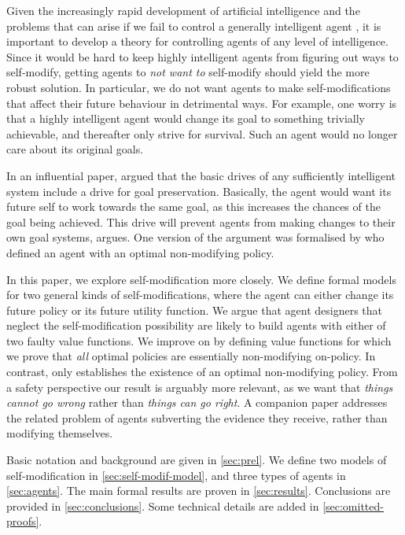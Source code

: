 \documentclass[a4paper]{article}
\theoremstyle{definition}
\theoremstyle{remark}
\begin{document}
Given the increasingly rapid development of artificial intelligence
and the problems that can arise if we fail to control a generally
intelligent agent \citep{Bostrom2014},
it is important to develop a theory for controlling agents of
any level of intelligence.
Since it would be hard to keep
highly intelligent agents from figuring out ways to self-modify,
getting agents to \emph{not want to} self-modify
should yield the more robust solution.
In particular, we do not want agents to make self-modifications
that affect their future behaviour in detrimental ways.
For example, one worry is that a highly intelligent agent would
change its goal to something
trivially achievable, and thereafter only strive for survival.
Such an agent would no longer care about its original goals.

In an influential paper, \citet{Omohundro2008} argued that
the basic drives of any sufficiently intelligent system
include a drive for goal preservation.
Basically, the agent would want its future self to work
towards the same goal, as this increases the chances of the
goal being achieved.
This drive will prevent agents from making changes
to their own goal systems, \citeauthor{Omohundro2008} argues.
One version of the argument was formalised by
\citet[Prop.~4]{Hibbard2012}
who defined an agent with an optimal non-modifying policy.

In this paper, we explore self-modification
more closely.
We define formal models for two general kinds of self-modifications,
where the agent can either change its future policy or its future utility
function.
We argue that agent designers that neglect the self-modification
possibility are likely to build agents with either
of two faulty value functions.
We improve on \citet[Prop.~4]{Hibbard2012} by defining value functions
for which we prove that \emph{all} optimal policies are essentially non-modifying
on-policy.
In contrast, \citeauthor{Hibbard2012} only establishes the existence of an
optimal non-modifying policy.
From a safety perspective our result is arguably more relevant,
as we want that \emph{things cannot go wrong} rather
than \emph{things can go right}.
A companion paper \citep{Everitt2016vrl} addresses the related problem
of agents subverting the evidence they receive, rather than
modifying themselves.

Basic notation and background are given in \cref{sec:prel}.
We define two models of self-modification in \cref{sec:self-modif-model},
and three types of agents in \cref{sec:agents}.
The main formal results are proven in \cref{sec:results}.
Conclusions are provided in \cref{sec:conclusions}.
Some technical details are added in \cref{sec:omitted-proofs}.
\end{document}

